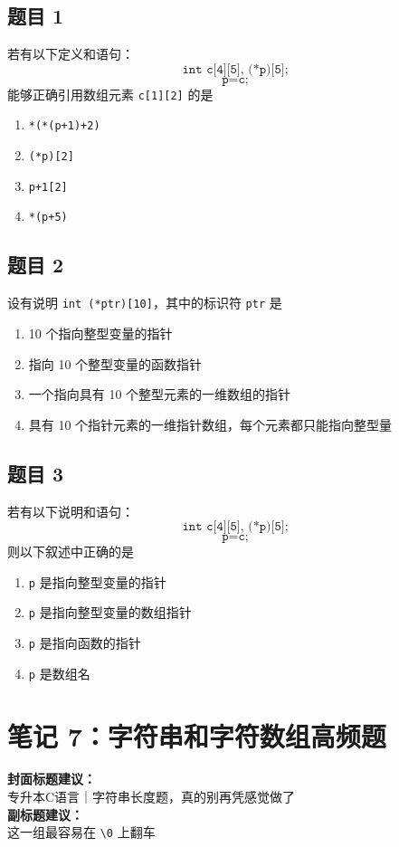 \documentclass[12pt,a4paper]{ctexart}
\begin{document}
\subsection*{题目 1}
若有以下定义和语句：
\[
\texttt{int c[4][5], (*p)[5];}
\]
\[
\texttt{p=c;}
\]
能够正确引用数组元素 \texttt{c[1][2]} 的是
\begin{enumerate}[label=\Alph*.]
    \item \texttt{*(*(p+1)+2)}
    \item \texttt{(*p)[2]}
    \item \texttt{p+1[2]}
    \item \texttt{*(p+5)}
\end{enumerate}

\subsection*{题目 2}
设有说明 \texttt{int (*ptr)[10]}，其中的标识符 \texttt{ptr} 是
\begin{enumerate}[label=\Alph*.]
    \item 10 个指向整型变量的指针
    \item 指向 10 个整型变量的函数指针
    \item 一个指向具有 10 个整型元素的一维数组的指针
    \item 具有 10 个指针元素的一维指针数组，每个元素都只能指向整型量
\end{enumerate}

\subsection*{题目 3}
若有以下说明和语句：
\[
\texttt{int c[4][5], (*p)[5];}
\]
\[
\texttt{p=c;}
\]
则以下叙述中正确的是
\begin{enumerate}[label=\Alph*.]
    \item \texttt{p} 是指向整型变量的指针
    \item \texttt{p} 是指向整型变量的数组指针
    \item \texttt{p} 是指向函数的指针
    \item \texttt{p} 是数组名
\end{enumerate}

\newpage

\section{笔记 7：字符串和字符数组高频题}
\begin{coverbox}
\textbf{封面标题建议：}\\
专升本C语言｜字符串长度题，真的别再凭感觉做了\\
\textbf{副标题建议：}\\
这一组最容易在 \texttt{\textbackslash 0} 上翻车
\end{coverbox}
\end{document}
